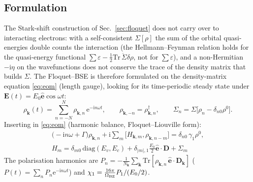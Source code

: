 \documentclass[11pt,a4paper]{article}
\newcommand{\ii}{\mathrm{i}}
\newcommand{\ee}{\mathrm{e}}
\newcommand{\kk}{\bm{k}}
\newcommand{\hate}{\hat{\bm{e}}}
\newcommand{\Nk}{N_{\bm k}}
\begin{document}
\subsection{Formulation}
The Stark-shift construction of Sec.~\ref{sec:floquet} does not carry over to interacting electrons: with a self-consistent $\Sigma[\rho]$
the sum of the orbital quasi-energies double counts the interaction (the Hellmann--Feynman relation holds for the quasi-energy functional
$\sum\varepsilon-\frac12\overline{\mathrm{Tr}\,\Sigma\delta\rho}$, not for $\sum\varepsilon$), and a non-Hermitian $-\ii\eta$ on the wavefunctions does not
conserve the trace of the density matrix that builds $\Sigma$. The Floquet--BSE is therefore formulated on the density-matrix equation
\eqref{eq:eom} (length gauge), looking for its time-periodic steady state under $\bm E(t)=E_0\hate\cos\omega t$:
\begin{equation}
\rho_{\kk}(t)=\sum_{n=-N}^{N}\rho_{\kk,n}\,\ee^{-\ii n\omega t},\qquad \rho_{\kk,-n}=\rho_{\kk,n}^\dagger,\qquad
\Sigma_n=\Sigma\big[\rho_n-\delta_{n0}\rho^0\big].
\end{equation}
Inserting in \eqref{eq:eom} (harmonic balance, Floquet--Liouville form):
\begin{equation}
\boxed{\begin{gathered}\big(-\ii n\omega+\Gamma\big)\rho_{\kk,n}+\ii\sum_{m}\big[H_{\kk,m},\rho_{\kk,n-m}\big]=\delta_{n0}\,\gamma_1\rho^0,\\
H_{m}=\delta_{m0}\,\mathrm{diag}(E_v,E_c)+\delta_{|m|,1}\tfrac{E_0}{2}\hate\cdot\bm D+\Sigma_m\end{gathered}}
\label{eq:flbse}
\end{equation}
The polarisation harmonics are $P_n=-\frac{1}{\Nk}\sum_{\kk}\mathrm{Tr}[\rho_{\kk,n}\,\hate\cdot\bm D_{\kk}]$ ($P(t)=\sum_nP_n\ee^{-\ii n\omega t}$) and
$\chi_1=\frac{16\pi}{\Omega_{\rm BZ}}P_1/(E_0/2)$.
\end{document}
